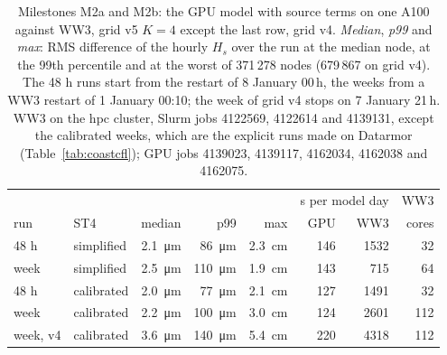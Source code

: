 \documentclass[11pt,a4paper]{article}
\begin{document}
\begin{table}[H]
\centering\small
\begin{tabular}{llrrrrrr}
\toprule
 & & & & & \multicolumn{2}{c}{s per model day} & WW3 \\
run & ST4 & median & p99 & max & GPU & WW3 & cores \\
\midrule
48 h & simplified & \SI{2.1}{\micro\metre} & \SI{86}{\micro\metre} & \SI{2.3}{cm} & 146 & 1532 & 32 \\
week & simplified & \SI{2.5}{\micro\metre} & \SI{110}{\micro\metre} & \SI{1.9}{cm} & 143 & 715 & 64 \\
48 h & calibrated & \SI{2.0}{\micro\metre} & \SI{77}{\micro\metre} & \SI{2.1}{cm} & 127 & 1491 & 32 \\
week & calibrated & \SI{2.2}{\micro\metre} & \SI{100}{\micro\metre} & \SI{3.0}{cm} & 124 & 2601 & 112 \\
week, v4 & calibrated & \SI{3.6}{\micro\metre} & \SI{140}{\micro\metre} & \SI{5.4}{cm} & 220 & 4318 & 112 \\
\bottomrule
\end{tabular}
\caption{Milestones M2a and M2b: the GPU model with source terms on one
A100 against WW3, grid v5 $K=4$ except the last row, grid v4.
\emph{Median}, \emph{p99} and \emph{max}: RMS difference of the hourly
$H_s$ over the run at the median node, at the 99th percentile and at the
worst of 371\,278 nodes (679\,867 on grid v4). The 48 h runs start from the
restart of 8 January 00\,h, the weeks from a WW3 restart of 1 January
00:10; the week of grid v4 stops on 7 January 21\,h. WW3 on the hpc
cluster, Slurm jobs 4122569, 4122614 and 4139131, except the calibrated
weeks, which are the explicit runs made on Datarmor
(Table~\ref{tab:coastcfl}); GPU jobs 4139023, 4139117, 4162034, 4162038
and 4162075.}
\label{tab:m2}
\end{table}
\end{document}
